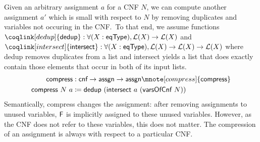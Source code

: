 \newcommand{\compressA}{\textsf{compress}}
\newcommand{\dedup}{\textsf{dedup}}
\newcommand{\intersect}{\textsf{intersect}}

Given an arbitrary assignment $a$ for a CNF $N$, we can compute another assignment $a'$ which is small with respect to $N$ by removing duplicates and variables not occuring in the CNF.\
To that end, we assume functions $\coqlink[dedup]{\dedup} : \forall (X : \eqType), \listsof{X} \rightarrow \listsof{X}$ and $\coqlink[intersect]{\intersect} : \forall (X : \eqType), \listsof{X} \rightarrow \listsof{X} \rightarrow \listsof{X}$ where \dedup{} removes duplicates from a list and \intersect{} yields a list that does exactly contain those elements that occur in both of its input lists.
\begin{align*}
  \compressA &: \cnf \rightarrow \assgn \rightarrow \assgn\mnote[compress]{\compressA}\\
  \compressA~N~a &\defeq \dedup~(\intersect~a~(\varsOfCnf~N))
\end{align*}
Semantically, \compressA{} changes the assignment: after removing assignments to unused variables, $\mathsf{F}$ is implicitly assigned to these unused variables. However, as the CNF does not refer to these variables, this does not matter. The compression of an assignment is always with respect to a particular CNF.



